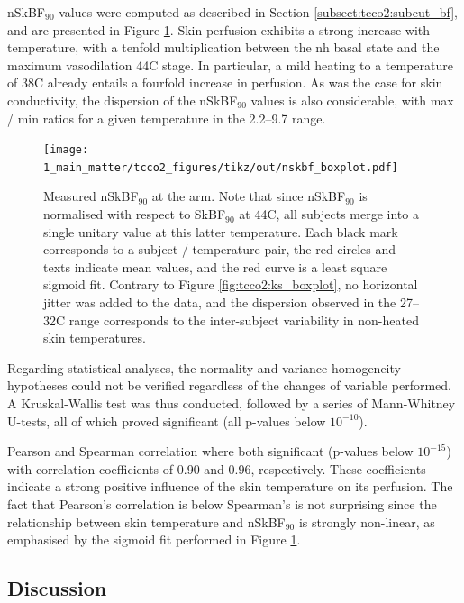 nSkBF$_{90}$ values were computed as described in Section \ref{subsect:tcco2:subcut_bf}, and are presented in Figure \ref{fig:tcco2:nskbf_boxplot}. Skin perfusion exhibits a strong increase with temperature, with a tenfold multiplication between the \gls{nh} basal state and the maximum vasodilation 44{\degree}C stage. In particular, a mild heating to a temperature of 38{\degree}C already entails a fourfold increase in perfusion. As was the case for skin conductivity, the dispersion of the nSkBF$_{90}$ values is also considerable, with max / min ratios for a given temperature in the 2.2--9.7 range.

\begin{figure}
	\centering
	\texttt{[image: 1\_main\_matter/tcco2\_figures/tikz/out/nskbf\_boxplot.pdf]}
	\caption[Measured nSkBF$_{90}$ at the arm.]{Measured nSkBF$_{90}$ at the arm. Note that since nSkBF$_{90}$ is normalised with respect to SkBF$_{90}$ at 44{\degree}C, all subjects merge into a single unitary value at this latter temperature. Each black mark corresponds to a subject / temperature pair, the red circles and texts indicate mean values, and the red curve is a least square sigmoid fit. Contrary to Figure \ref{fig:tcco2:ks_boxplot}, no horizontal jitter was added to the data, and the dispersion observed in the 27--32{\degree}C range corresponds to the inter-subject variability in non-heated skin temperatures.}\label{fig:tcco2:nskbf_boxplot}
\end{figure}

Regarding statistical analyses, the normality and variance homogeneity hypotheses could not be verified regardless of the changes of variable performed. A Kruskal-Wallis test was thus conducted, followed by a series of Mann-Whitney U-tests, all of which proved significant (all p-values below $10^{-10}$).

Pearson and Spearman correlation where both significant (p-values below $10^{-15}$) with correlation coefficients of 0.90 and 0.96, respectively. These coefficients indicate a strong positive influence of the skin temperature on its perfusion. The fact that Pearson's correlation is below Spearman's is not surprising since the relationship between skin temperature and nSkBF$_{90}$ is strongly non-linear, as emphasised by the sigmoid fit performed in Figure \ref{fig:tcco2:nskbf_boxplot}.

\subsection{Discussion}\label{sect:discussion}


